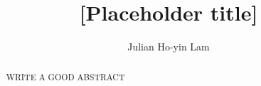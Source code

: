 \documentclass[]{report}
\title{[Placeholder title]}
\author{Julian Ho-yin Lam}
\begin{document}

\setcounter{page}{0}


\begin{abstract}
WRITE A GOOD ABSTRACT

\end{abstract}
\tableofcontents
\listoffigures
\listoftables
\setcounter{page}{0}











\end{document}
